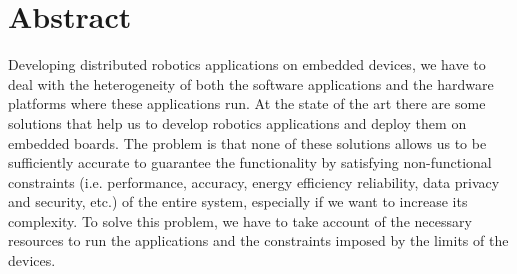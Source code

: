\chapter{Abstract}
Developing distributed robotics applications on embedded devices, we have to deal with the heterogeneity of both the software applications and the hardware platforms where these applications run.
At the state of the art there are some solutions that help us to develop robotics applications and deploy them on embedded boards. 
The problem is that none of these solutions allows us to be sufficiently accurate to guarantee the functionality by satisfying non-functional constraints (i.e. performance, accuracy, energy efficiency reliability, data privacy and security, etc.) of the entire system, especially if we want to increase its complexity.
To solve this problem, we have to take account of the necessary resources to run the applications and the constraints imposed by the limits of the devices.


\clearpage
\thispagestyle{empty}